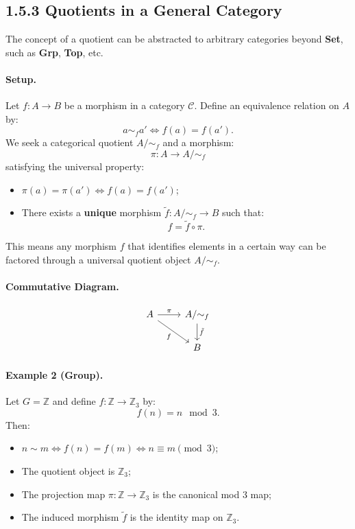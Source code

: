 \documentclass[10pt]{article}
\theoremstyle{plain}
\theoremstyle{definition}
\begin{document}
  \subsection*{1.5.3 Quotients in a General Category}
  
  The concept of a quotient can be abstracted to arbitrary categories beyond \textbf{Set}, such as \textbf{Grp}, \textbf{Top}, etc.
  
  \paragraph{Setup.} Let $f : A \to B$ be a morphism in a category $\mathcal{C}$. Define an equivalence relation on $A$ by:
  \[
  a \sim_f a' \iff f(a) = f(a').
  \]
  We seek a categorical quotient $A/{\sim_f}$ and a morphism:
  \[
  \pi : A \longrightarrow A/{\sim_f}
  \]
  satisfying the universal property:
  
  \begin{itemize}
  	\item $\pi(a) = \pi(a') \iff f(a) = f(a')$;
  	\item There exists a \textbf{unique} morphism $\tilde{f} : A/{\sim_f} \to B$ such that:
  	\[
  	f = \tilde{f} \circ \pi.
  	\]
  \end{itemize}
  
  This means any morphism $f$ that identifies elements in a certain way can be factored through a universal quotient object $A/{\sim_f}$.
  
  \paragraph{Commutative Diagram.}
  \[
  \begin{tikzcd}
  	A \arrow[r, "\pi"] \arrow[dr, "f"'] & A/{\sim_f} \arrow[d, "\tilde{f}"] \\
  	& B
  \end{tikzcd}
  \]
  
  \paragraph{Example 2 (Group).}
  Let $G = \mathbb{Z}$ and define $f : \mathbb{Z} \to \mathbb{Z}_3$ by:
  \[
  f(n) = n \mod 3.
  \]
  Then:
  \begin{itemize}
  	\item $n \sim m \iff f(n) = f(m) \iff n \equiv m \pmod{3}$;
  	\item The quotient object is $\mathbb{Z}_3$;
  	\item The projection map $\pi : \mathbb{Z} \to \mathbb{Z}_3$ is the canonical mod 3 map;
  	\item The induced morphism $\tilde{f}$ is the identity map on $\mathbb{Z}_3$.
  \end{itemize}
  
\end{document}
